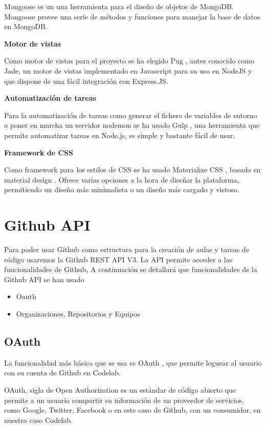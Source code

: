 Mongoose \cite{B8} es un una herramienta para el diseño de objetos de MongoDB. 
Mongoose provee una serie de métodos y funciones para manejar la base de datos en MongoDB.

{\bf Motor de vistas}

Como motor de vistas para el proyecto se ha elegido Pug \cite{B7}, antes conocido como Jade, un motor de vistas implementado en Javascript para su uso en NodeJS y que dispone de una fácil integración con Express.JS. 

{\bf Automatización de tareas}

Para la automatización de tareas como generar el fichero de variables de entorno o poner en marcha un servidor nodemon se ha usado Gulp \cite{B2}, una herramienta que permite automatizar tareas en Node.js, es simple y bastante fácil de usar.

{\bf Framework de CSS}

Como framework para los estilos de CSS se ha usado Materialize CSS \cite{B19}, basado en material design \cite{b16}. Ofrece varias opciones a la hora de diseñar la plataforma, permitiendo un diseño más minimalista o un diseño más cargado y vistoso.

\section{Github API}
\label{3:sec2}

Para poder usar Github como estructura para la creación de aulas y tareas de código usaremos la Github REST API V3.
La API permite acceder a las funcionalidades de Github, A continuación se detallará que funcionalidades de la Github API se han usado

\begin{itemize}
  \item Oauth
  \item Organizaciones, Repositorios y Equipos
\end{itemize}

\subsection{OAuth}
\label{3:2:1}

La funcionalidad más básica que se usa es OAuth \cite{B17}, que permite loguear al usuario con su cuenta de Github en
Codelab.

OAuth, sigla de Open Authorization es un estándar de código abierto que permite a un usuario compartir su información de un proveedor de servicios, como Google, Twitter, Facebook o en este caso de Github, con un consumidor, en nuestro caso Codelab.

